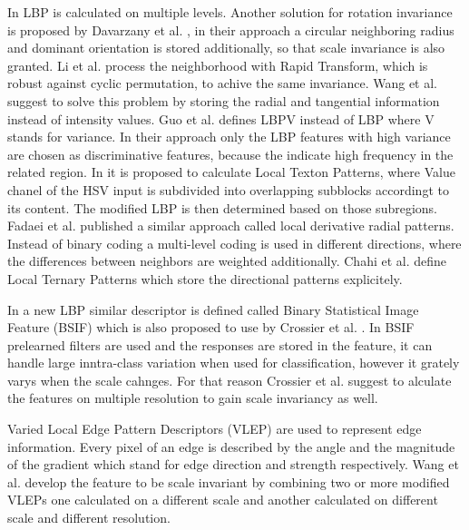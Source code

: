 \documentclass[draft,final]{vutinfth} %
\begin{document}
In \cite{khellah2011texture} LBP is calculated on multiple levels.
Another solution for rotation invariance is proposed by Davarzany et al. \cite{davarzani2015scale}, in their approach a circular neighboring radius and dominant orientation is stored additionally, so that scale invariance is also granted.
Li et al. \cite{li2014rapid} process the neighborhood with Rapid Transform, which is robust against cyclic permutation, to achive the same invariance.
Wang et al. \cite{wang2017local} suggest to solve this problem by storing the radial and tangential information instead of intensity values.
Guo et al. \cite{guo2010rotation} defines LBPV instead of LBP where V stands for variance.
In their approach only the LBP features with high variance are chosen as discriminative features, because the indicate high frequency in the related region.
In \cite{bala2016local} it is proposed to calculate Local Texton Patterns, where Value chanel of the HSV input is subdivided into overlapping subblocks accordingt to its content.
The modified LBP is then determined based on those subregions.
Fadaei et al. \cite{fadaei2017local} published a similar approach called local derivative radial patterns.
Instead of binary coding a multi-level coding is used in different directions, where the differences between neighbors are weighted additionally.
Chahi et al. \cite{chahi2018local} define Local Ternary Patterns which store the directional patterns explicitely.
\par
In \cite{kannala2012bsif} a new LBP similar descriptor is defined called Binary Statistical Image Feature (BSIF) which is also proposed to use by Crossier et al. \cite{crosier2010using}.
In BSIF prelearned filters are used and the responses are stored in the feature, it can handle large inntra-class variation when used for classification, however it grately varys when the scale cahnges.
For that reason Crossier et al. \cite{crosier2010using} suggest to alculate the features on multiple resolution to gain scale invariancy as well.
\par
Varied Local Edge Pattern Descriptors (VLEP) \cite{yan2016edge} are used to represent edge information.
Every pixel of an edge is described by the angle and the magnitude of the gradient which stand for edge direction and strength respectively.
Wang et al. \cite{wang2018using} develop the feature to be scale invariant by combining two or more modified VLEPs one calculated on a different scale and another calculated on different scale and different resolution.
\end{document}
